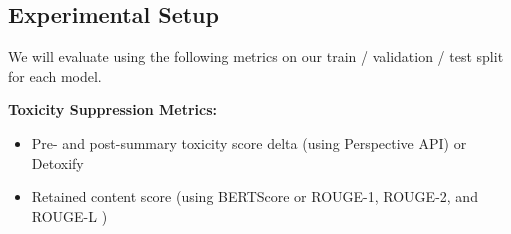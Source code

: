 \documentclass{article}
\begin{document}
\subsection{Experimental Setup}
We will evaluate using the following metrics on our train / validation / test split for each model.


\textbf{Toxicity Suppression Metrics:}

\begin{itemize}
    
        \item Pre- and post-summary toxicity score delta (using Perspective API) \cite{perspectiveapi} or Detoxify \cite{Detoxify}
        \item Retained content score (using BERTScore or ROUGE-1, ROUGE-2, and ROUGE-L ) \cite{barbella2022rouge}
\end{itemize}



\end{document}
